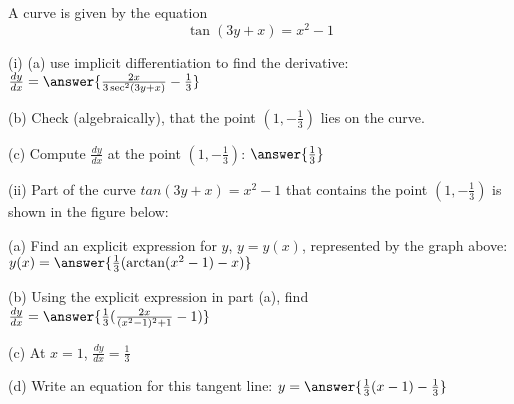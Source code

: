 \documentclass{ximera}
\begin{document}
\begin{exercise}
A curve is given by the equation $$\tan(3y+x)=x^2-1$$

(i) (a) use implicit differentiation to find the derivative: $\frac{dy}{dx}=\answer{\frac{2x}{3\sec^2(3y+x)}-\frac{1}{3}}$

(b) Check (algebraically), that the point $(1,-\frac{1}{3})$ lies on the curve.

(c) Compute $\frac{dy}{dx}$ at the point $(1,-\frac{1}{3})$: $\answer{\frac{1}{3}}$
 
(ii) Part of the curve $tan(3y+x)=x^2-1$ that contains the point $(1,-\frac{1}{3})$ is shown in the figure below:

\begin{image}
\end{image}

(a) Find an explicit expression for $y$, $y=y(x)$, represented by the graph above: $y(x)=\answer{\frac{1}{3}(\arctan(x^2-1)-x)}$

(b) Using the explicit expression in part (a), find $\frac{dy}{dx}=\answer{\frac{1}{3}(\frac{2x}{(x^2-1)^2+1}-1)}$

(c) At $x=1$, $\frac{dy}{dx}=\frac{1}{3}$



(d) Write an equation for this tangent line: $y=\answer{\frac{1}{3}(x-1)-\frac{1}{3}}$
\end{exercise}
\end{document}
